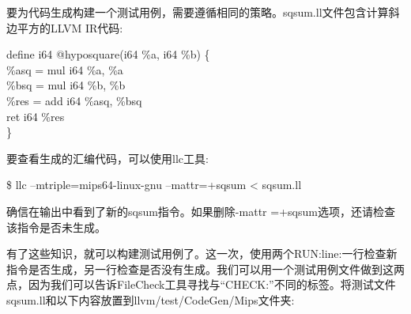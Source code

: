 要为代码生成构建一个测试用例，需要遵循相同的策略。sqsum.ll文件包含计算斜边平方的LLVM IR代码:\par

\begin{tcolorbox}[colback=white,colframe=black]
define i64 @hyposquare(i64 \%a, i64 \%b) \{ \\
\hspace*{0.5cm}\%asq = mul i64 \%a, \%a \\
\hspace*{0.5cm}\%bsq = mul i64 \%b, \%b \\
\hspace*{0.5cm}\%res = add i64 \%asq, \%bsq \\
\hspace*{0.5cm}ret i64 \%res \\
\}
\end{tcolorbox}

要查看生成的汇编代码，可以使用llc工具:\par

\begin{tcolorbox}[colback=white,colframe=black]
\$ llc –mtriple=mips64-linux-gnu –mattr=+sqsum < sqsum.ll
\end{tcolorbox}

确信在输出中看到了新的sqsum指令。如果删除-mattr =+sqsum选项，还请检查该指令是否未生成。\par

有了这些知识，就可以构建测试用例了。这一次，使用两个RUN:line:一行检查新指令是否生成，另一行检查是否没有生成。我们可以用一个测试用例文件做到这两点，因为我们可以告诉FileCheck工具寻找与“CHECK:”不同的标签。将测试文件sqsum.ll和以下内容放置到llvm/test/CodeGen/Mips文件夹:\par

